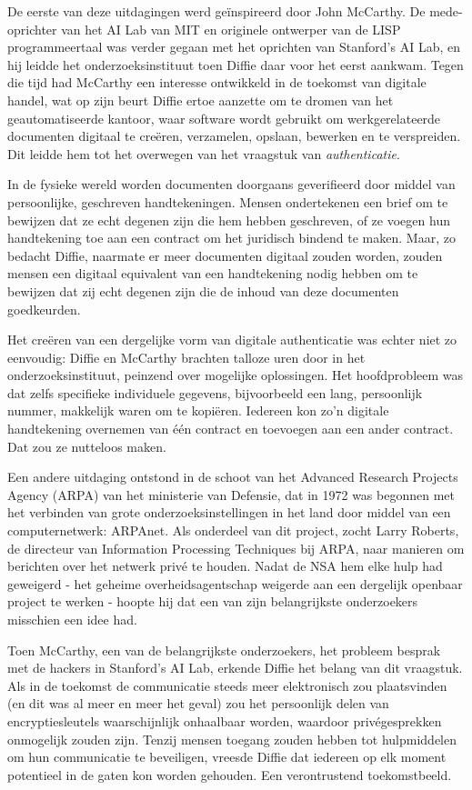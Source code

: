 \documentclass[
  a5paper,
  smalldemyvopaper,11pt,twoside,onecolumn,openright,extrafontsizes]{memoir}
\begin{document}
De eerste van deze uitdagingen werd geïnspireerd door John McCarthy. De
mede-oprichter van het AI Lab van MIT en originele ontwerper van de LISP
programmeertaal was verder gegaan met het oprichten van Stanford's AI
Lab, en hij leidde het onderzoeksinstituut toen Diffie daar voor het
eerst aankwam. Tegen die tijd had McCarthy een interesse ontwikkeld in
de toekomst van digitale handel, wat op zijn beurt Diffie ertoe aanzette
om te dromen van het geautomatiseerde kantoor, waar software wordt
gebruikt om werkgerelateerde documenten digitaal te creëren, verzamelen,
opslaan, bewerken en te verspreiden. Dit leidde hem tot het overwegen
van het vraagstuk van \emph{authenticatie}.

In de fysieke wereld worden documenten doorgaans geverifieerd door
middel van persoonlijke, geschreven handtekeningen. Mensen ondertekenen
een brief om te bewijzen dat ze echt degenen zijn die hem hebben
geschreven, of ze voegen hun handtekening toe aan een contract om het
juridisch bindend te maken. Maar, zo bedacht Diffie, naarmate er meer
documenten digitaal zouden worden, zouden mensen een digitaal equivalent
van een handtekening nodig hebben om te bewijzen dat zij echt degenen
zijn die de inhoud van deze documenten goedkeurden.

Het creëren van een dergelijke vorm van digitale authenticatie was
echter niet zo eenvoudig: Diffie en McCarthy brachten talloze uren door
in het onderzoeksinstituut, peinzend over mogelijke oplossingen. Het
hoofdprobleem was dat zelfs specifieke individuele gegevens,
bijvoorbeeld een lang, persoonlijk nummer, makkelijk waren om te
kopiëren. Iedereen kon zo'n digitale handtekening overnemen van één
contract en toevoegen aan een ander contract. Dat zou ze nutteloos
maken.

Een andere uitdaging ontstond in de schoot van het Advanced Research
Projects Agency (ARPA) van het ministerie van Defensie, dat in 1972 was
begonnen met het verbinden van grote onderzoeksinstellingen in het land
door middel van een computernetwerk: ARPAnet. Als onderdeel van dit
project, zocht Larry Roberts, de directeur van Information Processing
Techniques bij ARPA, naar manieren om berichten over het netwerk privé
te houden. Nadat de NSA hem elke hulp had geweigerd - het geheime
overheidsagentschap weigerde aan een dergelijk openbaar project te
werken - hoopte hij dat een van zijn belangrijkste onderzoekers
misschien een idee had.

Toen McCarthy, een van de belangrijkste onderzoekers, het probleem
besprak met de hackers in Stanford's AI Lab, erkende Diffie het belang
van dit vraagstuk. Als in de toekomst de communicatie steeds meer
elektronisch zou plaatsvinden (en dit was al meer en meer het geval) zou
het persoonlijk delen van encryptiesleutels waarschijnlijk onhaalbaar
worden, waardoor privégesprekken onmogelijk zouden zijn. Tenzij mensen
toegang zouden hebben tot hulpmiddelen om hun communicatie te
beveiligen, vreesde Diffie dat iedereen op elk moment potentieel in de
gaten kon worden gehouden. Een verontrustend toekomstbeeld.
\end{document}
